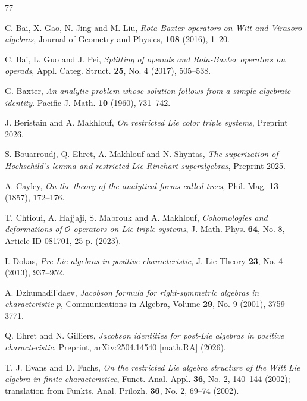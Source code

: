 \documentclass[11pt, twoside]{article}
\begin{document}
\begin{thebibliography}{77}

        C. Bai, X. Gao, N. Jing and M. Liu,
        \emph{Rota-Baxter operators on Witt and Virasoro algebras}, Journal of Geometry and Physics, {\bf 108} (2016), 1--20.

         C. Bai, L. Guo and J. Pei,
        \emph{Splitting of operads and Rota-Baxter operators on operads},
Appl. Categ. Struct. {\bf 25}, No. 4 (2017), 505--538.

        G. Baxter, 
        \emph{An analytic problem whose solution follows from a simple algebraic identity}. Pacific J. Math. {\bf 10} (1960), 731--742.

        
        J. Beristain and A. Makhlouf,
        \emph{On restricted Lie color triple systems}, Preprint 2026.

        S. Bouarroudj, Q. Ehret, A. Makhlouf and N. Shyntas,
        \emph{The superization of Hochschild’s lemma and restricted
Lie-Rinehart superalgebras}, Preprint 2025.

        A. Cayley,
        \emph{On the theory of the analytical forms called trees}, Phil. Mag. {\bf 13} (1857), 172--176.

        T. Chtioui, A. Hajjaji, S. Mabrouk and A. Makhlouf,
        \emph{Cohomologies and deformations of $\mathcal{O}$-operators on Lie triple systems}, 
 J. Math. Phys. {\bf 64}, No. 8, Article ID 081701, 25 p. (2023).
 
        I. Dokas,
        \emph{Pre-Lie algebras in positive characteristic},
J. Lie Theory {\bf 23}, No. 4 (2013), 937--952.

        A. Dzhumadil'daev,
        \emph{Jacobson formula for right-symmetric algebras in characteristic $p$}, Communications in Algebra, Volume {\bf 29}, No. 9 (2001), 3759--3771.

        Q. Ehret and N. Gilliers,
        \emph{Jacobson identities for post-Lie algebras in positive characteristic}, Preprint, arXiv:2504.14540 [math.RA] (2026).

        T. J. Evans and D. Fuchs,
        \emph{On the restricted Lie algebra structure of the Witt Lie algebra in finite characteristicc}, 
Funct. Anal. Appl. {\bf 36}, No. 2, 140--144 (2002); translation from Funkts. Anal. Prilozh. {\bf 36}, No. 2, 69--74 (2002).


\end{thebibliography}
\end{document}
